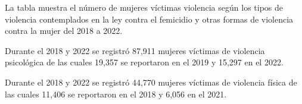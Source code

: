 La tabla muestra el número de mujeres víctimas violencia según los tipos de violencia contemplados en la ley contra el femicidio y otras formas de violencia contra la mujer del 2018 a 2022. 

Durante el 2018 y 2022 se registró 87,911 mujeres víctimas de violencia psicológica de las cuales 19,357 se reportaron en el 2019 y 15,297 en el 2022. 

Durante el 2018 y 2022 se registró 44,770 mujeres víctimas de violencia física de las cuales 11,406 se reportaron en el 2018 y 6,056 en el 2021. 
